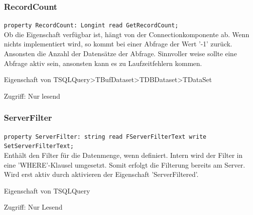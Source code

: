\subsubsection{RecordCount}
\begin{description}
  \item \texttt{property RecordCount: Longint read GetRecordCount;}\\Ob die Eigenschaft verfügbar ist, hängt von der Connectionkomponente ab. Wenn nichts implementiert wird, so kommt bei einer Abfrage der Wert '-1' zurück. Ansonsten die Anzahl der Datensätze der Abfrage. Sinnvoller weise sollte eine Abfrage aktiv sein, ansonsten kann es zu Laufzeitfehlern kommen.
  \begin{description}
    \item Eigenschaft von TSQLQuery>TBufDataset>TDBDataset>TDataSet
  \end{description}
  \begin{description}
    \item Zugriff: Nur lesend
  \end{description}
\end{description}

\subsubsection{ServerFilter}
\begin{description}
  \item \texttt{property ServerFilter: string read FServer\-Filter\-Text write Set\-Server\-Filter\-Text;}\\Enthält den Filter für die Datenmenge, wenn definiert. Intern wird der Filter in eine 'WHERE'-Klausel umgesetzt. Somit erfolgt die Filterung bereits am Server. Wird erst aktiv durch aktivieren der Eigenschaft 'ServerFiltered'.
  \begin{description}
    \item Eigenschaft von TSQLQuery
  \end{description}
  \begin{description}
    \item Zugriff: Nur Lesend
  \end{description}
\end{description}

